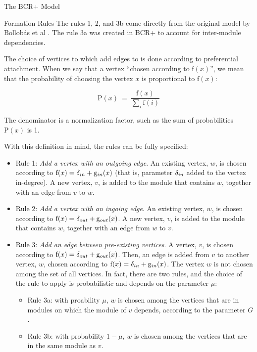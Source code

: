 \documentclass[11pt,twocolumn,a4paper,english]{article}
\begin{document}
\begin{section}{The BCR+ Model}
\begin{subsection}{Formation Rules}
	The rules 1, 2, and 3b come directly from the original model by Bollobás et al \cite{Bollobas2003}. The rule 3a was created in BCR+ to account for inter-module dependencies.
	
	The choice of vertices to which add edges to is done according to preferential attachment. When we say that a vertex ``chosen according to $\mathrm{f}(x)$'', we mean that the probability of choosing the vertex $x$ is proportional to $\mathrm{f}(x)$:
	
	$$
	  \mathrm{P}(x) ~=~ \frac{ \mathrm{f}(x) }
	  { \displaystyle\sum_{i} \mathrm{f}(i) }
	$$
	
	The denominator is a normalization factor, such as the sum of probabilities $\mathrm{P}(x)$ is 1.
	
	With this definition in mind, the rules can be fully specified:
	
	\begin{itemize}
		\item Rule 1: \emph{Add a vertex with an outgoing edge}. An existing vertex, $w$, is chosen according to $\mathrm{f}(x) = \delta_{in} + \mathrm{g}_{in}(x)$ (that is, parameter $\delta_{in}$ added to the vertex in-degree). A new vertex, $v$, is added to the module that contains $w$, together with an edge from $v$ to $w$.

		\item Rule 2: \emph{Add a vertex with an ingoing edge}. An existing vertex, $w$, is chosen according to $\mathrm{f}(x) = \delta_{out} + \mathrm{g}_{out}(x)$. A new vertex, $v$, is added to the module that contains $w$, together with an edge from $w$ to $v$.

		\item Rule 3: \emph{Add an edge between pre-existing vertices}. A vertex, $v$, is chosen according to $\mathrm{f}(x) = \delta_{out} + \mathrm{g}_{out}(x)$. Then, an edge is added from $v$ to another vertex, $w$, chosen according to $\mathrm{f}(x) = \delta_{in} + \mathrm{g}_{in}(x)$. The vertex $w$ is not chosen among the set of all vertices. In fact, there are two rules, and the choice of the rule to apply is probabilistic and depends on the parameter $\mu$:

		\begin{itemize}
		  \item Rule 3a: with proability $\mu$, $w$ is chosen among the vertices that are in modules on which the module of $v$ depends, according to the parameter $G$.
		  \item Rule 3b: with probability $1 - \mu$, $w$ is chosen among the vertices that are in the same module as $v$.
		\end{itemize}
	\end{itemize}
	

\end{subsection}
\end{section}
\end{document}

